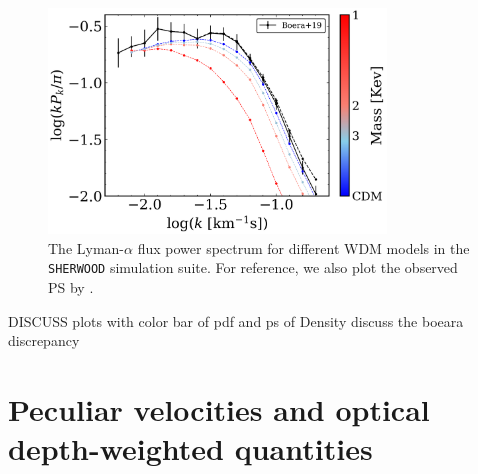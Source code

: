 \begin{figure}
        \centering
        \includegraphics[width=0.8\textwidth]{img/ML/PS_sherwood.png}
        \caption{The Lyman-$\alpha$ flux power spectrum for different WDM models in the \texttt{SHERWOOD} simulation suite. For reference, we also plot the observed PS by \cite{Boera_2019}.}
        \label{fig: sherwood exact PS}     
\end{figure}


DISCUSS plots with color bar of pdf and ps of Density discuss the boeara discrepancy




\section{Peculiar velocities and optical depth-weighted quantities}\label{sec: optical depth weighted}